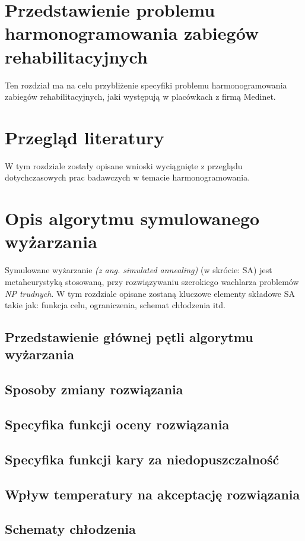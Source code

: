


\chapter{Przedstawienie problemu harmonogramowania zabiegów rehabilitacyjnych}
Ten rozdział ma na celu przybliżenie specyfiki problemu harmonogramowania zabiegów
rehabilitacyjnych, jaki występują w placówkach z firmą Medinet.

\chapter{Przegląd literatury}
W tym rozdziale zostały opisane wnioski wyciągnięte z przeglądu dotychczasowych
prac badawczych w temacie harmonogramowania.

\chapter{Opis algorytmu symulowanego wyżarzania} \label{chapter:sa-desc}
Symulowane wyżarzanie \cite{metaheuristic-handbook} \emph{(z ang. simulated annealing)} (w skrócie: SA) jest metaheurystyką stosowaną, przy rozwiązywaniu szerokiego wachlarza problemów \emph{NP trudnych}. W tym rozdziale opisane zostaną kluczowe elementy składowe SA takie jak: funkcja celu, ograniczenia, schemat chłodzenia itd.

\section{Przedstawienie głównej pętli algorytmu wyżarzania}
\section{Sposoby zmiany rozwiązania} 
\section{Specyfika funkcji oceny rozwiązania}
\section{Specyfika funkcji kary za niedopuszczalność}
\section{Wpływ temperatury na akceptację rozwiązania}
\section{Schematy chłodzenia}


